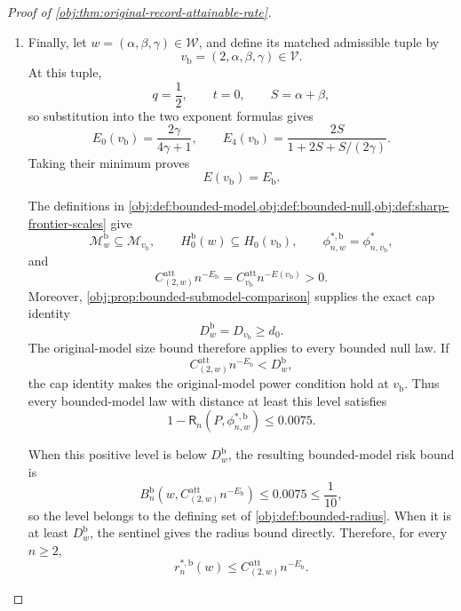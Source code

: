 \begin{proof}[Proof of \cref{obj:thm:original-record-attainable-rate}]
\begin{enumerate}
\item Finally, let \(w=(\alpha,\beta,\gamma)\in\mathcal W\), and define its matched admissible tuple by
\[
v_{\mathrm b}=(2,\alpha,\beta,\gamma)\in\mathcal V.
\]
At this tuple,
\[
q=\frac12,\qquad t=0,\qquad S=\alpha+\beta,
\]
so substitution into the two exponent formulas gives
\[
E_0(v_{\mathrm b})=\frac{2\gamma}{4\gamma+1},
\qquad
E_4(v_{\mathrm b})
=\frac{2S}{1+2S+S/(2\gamma)}.
\]
Taking their minimum proves
\[
E(v_{\mathrm b})=E_{\mathrm b}.
\]

The definitions in
\cref{obj:def:bounded-model,obj:def:bounded-null,obj:def:sharp-frontier-scales}
give
\[
\mathcal M_w^{\mathrm b}\subseteq\mathcal M_{v_{\mathrm b}},
\qquad
H_0^{\mathrm b}(w)\subseteq H_0(v_{\mathrm b}),
\qquad
\phi^{*,\mathrm b}_{n,w}=\phi^*_{n,v_{\mathrm b}},
\]
and
\[
C^{\mathrm{att}}_{(2,w)}n^{-E_{\mathrm b}}
=C^{\mathrm{att}}_{v_{\mathrm b}}n^{-E(v_{\mathrm b})}>0.
\]
Moreover, \cref{obj:prop:bounded-submodel-comparison} supplies the exact cap identity
\[
D_w^{\mathrm b}=D_{v_{\mathrm b}}\ge d_0.
\]
The original-model size bound therefore applies to every bounded null law. If
\[
C^{\mathrm{att}}_{(2,w)}n^{-E_{\mathrm b}}<D_w^{\mathrm b},
\]
the cap identity makes the original-model power condition hold at
\(v_{\mathrm b}\). Thus every bounded-model law with distance at least this level satisfies
\[
1-\mathsf R_n(P,\phi^{*,\mathrm b}_{n,w})\le0.0075.
\]

When this positive level is below \(D_w^{\mathrm b}\), the resulting bounded-model risk bound is
\[
B_n^{\mathrm b}
\!\left(w,C^{\mathrm{att}}_{(2,w)}n^{-E_{\mathrm b}}\right)
\le0.0075\le\frac1{10},
\]
so the level belongs to the defining set of
\cref{obj:def:bounded-radius}. When it is at least \(D_w^{\mathrm b}\), the sentinel gives the radius bound directly. Therefore, for every \(n\ge2\),
\[
r_n^{*,\mathrm b}(w)
\le C^{\mathrm{att}}_{(2,w)}n^{-E_{\mathrm b}}.
\]
\end{enumerate}
\end{proof}


